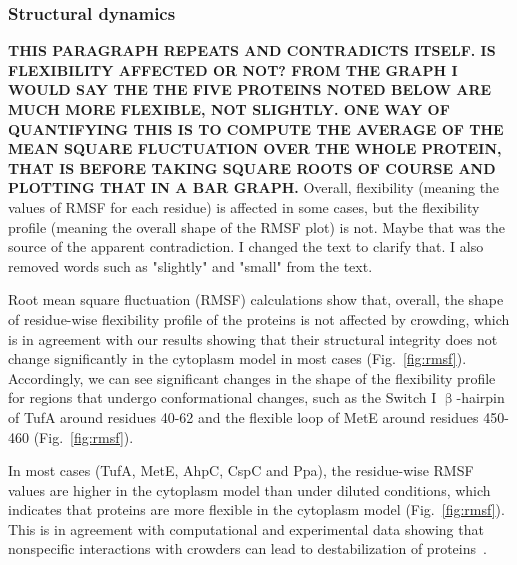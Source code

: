 \documentclass[journal=jcisd8,manuscript=article]{achemso}
\begin{document}
\subsubsection{Structural dynamics}
{\bf THIS PARAGRAPH REPEATS AND CONTRADICTS ITSELF. IS FLEXIBILITY
  AFFECTED OR NOT? FROM THE GRAPH I WOULD SAY THE THE FIVE PROTEINS
  NOTED BELOW ARE MUCH MORE FLEXIBLE, NOT SLIGHTLY. ONE WAY OF
  QUANTIFYING THIS IS TO COMPUTE THE AVERAGE OF THE MEAN SQUARE
  FLUCTUATION OVER THE WHOLE PROTEIN, THAT IS BEFORE TAKING SQUARE
  ROOTS OF COURSE AND PLOTTING THAT IN A BAR GRAPH.} {\color{blue} Overall, flexibility (meaning the values of RMSF for each residue) is affected in some cases, but the flexibility profile (meaning the overall shape of the RMSF plot) is not. Maybe that was the source of the apparent contradiction. I changed the text to clarify that. I also removed words such as "slightly" and "small" from the text.}
  
Root mean square fluctuation (RMSF) calculations show that, overall, the shape of residue-wise flexibility profile of the proteins is not affected by crowding, which is in agreement with our results showing that their structural integrity does not change significantly in the cytoplasm model in most cases (Fig.~\ref{fig:rmsf}). Accordingly, we can see significant changes in the shape of the flexibility profile for regions that undergo conformational changes, such as the Switch I $\upbeta$-hairpin of TufA around residues 40-62 and the flexible loop of MetE around residues 450-460 (Fig.~\ref{fig:rmsf}).

In most cases (TufA, MetE, AhpC, CspC and Ppa), the residue-wise RMSF values are higher in the cytoplasm model than under diluted conditions, which indicates that proteins are more flexible in the cytoplasm model (Fig.~\ref{fig:rmsf}). This is in agreement with computational and experimental data showing that nonspecific interactions with crowders can lead to destabilization of
proteins~\cite{Feig2011, miklos2011, Wang2012b}.
\end{document}
